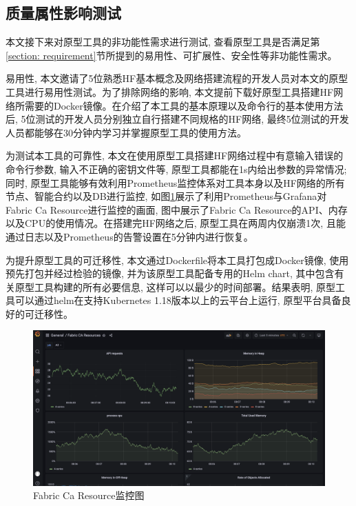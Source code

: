 \subsection{质量属性影响测试}

本文接下来对原型工具的非功能性需求进行测试, 查看原型工具是否满足第\ref{section: requirement}节所提到的易用性、可扩展性、安全性等非功能性需求。

易用性, 本文邀请了5位熟悉HF基本概念及网络搭建流程的开发人员对本文的原型工具进行易用性测试。为了排除网络的影响,
本文提前下载好原型工具搭建HF网络所需要的Docker镜像。在介绍了本工具的基本原理以及命令行的基本使用方法后, 5位测试的开发人员分别独立自行搭建不同规格的HF网络, 最终5位测试的开发人员都能够在30分钟内学习并掌握原型工具的使用方法。

为测试本工具的可靠性, 本文在使用原型工具搭建HF网络过程中有意输入错误的命令行参数, 输入不正确的密钥文件等, 原型工具都能在1s内给出参数的异常情况; 同时, 原型工具能够有效利用Prometheus监控体系对工具本身以及HF网络的所有节点、智能合约以及DB进行监控, 如图\ref{monitoring}展示了利用Prometheus与Grafana对Fabric Ca Resource进行监控的画面, 图中展示了Fabric Ca Resource的API、内存以及CPU的使用情况。在搭建完HF网络之后, 原型工具在两周内仅崩溃1次, 且能通过日志以及Prometheus的告警设置在5分钟内进行恢复。

为提升原型工具的可迁移性, 本文通过Dockerfile将本工具打包成Docker镜像, 使用预先打包并经过检验的镜像, 并为该原型工具配备专用的Helm chart, 其中包含有关原型工具构建的所有必要信息, 这样可以以最少的时间部署。结果表明, 原型工具可以通过helm在支持Kubernetes 1.18版本以上的云平台上运行, 原型平台具备良好的可迁移性。

\begin{figure}[h] %
    \centering %
    \includegraphics[width=1.0\textwidth]{FIGs/chapter5/monitoring.png} %
    \caption{Fabric Ca Resource监控图} %
    \label{monitoring} %
\end{figure}%

